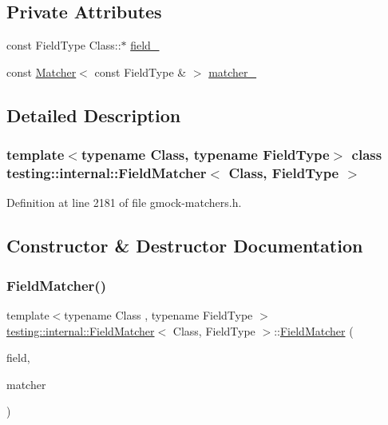 \subsection*{Private Attributes}
\begin{DoxyCompactItemize}
\item 
const Field\+Type Class\+::$\ast$ \hyperlink{classtesting_1_1internal_1_1FieldMatcher_a5937d084f46df4f81948c33688408d31}{field\+\_\+}
\item 
const \hyperlink{classtesting_1_1Matcher}{Matcher}$<$ const Field\+Type \& $>$ \hyperlink{classtesting_1_1internal_1_1FieldMatcher_a14eca9e5ca69aabaa9fe288effb1f57c}{matcher\+\_\+}
\end{DoxyCompactItemize}


\subsection{Detailed Description}
\subsubsection*{template$<$typename Class, typename Field\+Type$>$\newline
class testing\+::internal\+::\+Field\+Matcher$<$ Class, Field\+Type $>$}



Definition at line 2181 of file gmock-\/matchers.\+h.



\subsection{Constructor \& Destructor Documentation}
\mbox{\label{classtesting_1_1internal_1_1FieldMatcher_a5d20aa34edd41eb898b1f8dd35d585f5}} 
\subsubsection{\texorpdfstring{Field\+Matcher()}{FieldMatcher()}}
{\footnotesize\ttfamily template$<$typename Class , typename Field\+Type $>$ \\
\hyperlink{classtesting_1_1internal_1_1FieldMatcher}{testing\+::internal\+::\+Field\+Matcher}$<$ Class, Field\+Type $>$\+::\hyperlink{classtesting_1_1internal_1_1FieldMatcher}{Field\+Matcher} (\begin{DoxyParamCaption}\item[{Field\+Type Class\+::$\ast$}]{field,  }\item[{const \hyperlink{classtesting_1_1Matcher}{Matcher}$<$ const Field\+Type \&$>$ \&}]{matcher }\end{DoxyParamCaption})\hspace{0.3cm}{\ttfamily [inline]}}



